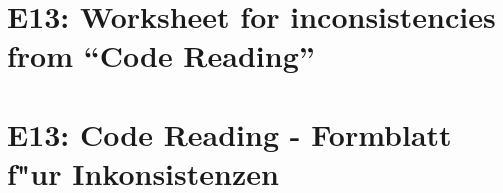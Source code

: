 
\thispagestyle{empty}
\ifenglish
\section*{E13: Worksheet for inconsistencies from ``Code Reading''}

\fi
\ifgerman
\section*{E13: Code Reading - Formblatt f"ur Inkonsistenzen}

\fi

